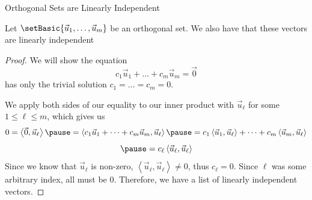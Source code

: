 \documentclass[xcoler=dvipsnames, aspectratio=169]{beamer}
\newcommand{\ip}[2]{\left\langle #1,#2\right\rangle}
\begin{document}
    \begin{frame}{Orthogonal Sets are Linearly Independent}
        \small
        \begin{theorem}
            Let $\setBasic{\vec{u}_1,\dots,\vec{u}_m}$ be an orthogonal set. We also have that
            these vectors are linearly independent
        \end{theorem}\pause
        \begin{proof}
            We will show the equation
            \[
                c_1\vec{u}_1 + \dots + c_m\vec{u}_m = \vec{0}
            \]
            has only the trivial solution $c_1=\dots=c_m=0$.

            We apply both sides of our equality to our inner product with $\vec{u}_\ell$ for some
            $1\leq\ell\leq m$, which gives us
            \[
                0 = \ip{\vec{0}}{\vec{u}_\ell}\pause =
                \ip{c_1\vec{u}_1 + \dots + c_m\vec{u}_m}{\vec{u}_\ell}
                \pause = c_1\ip{\vec{u}_1}{\vec{u}_\ell} + \dots + c_m\ip{\vec{u}_m}{\vec{u}_\ell}
            \]
            \vspace{-20pt}
            \[
                \pause = c_\ell\ip{\vec{u}_\ell}{\vec{u}_\ell}
            \]
            Since we know that $\vec{u}_\ell$ is non-zero, $\ip{\vec{u}_\ell}{\vec{u}_\ell}\neq 0$,
            thus $c_\ell=0$. Since $\ell$ was some arbitrary index, all must be $0$. Therefore,
            we have a list of linearly independent vectors.
        \end{proof}
    \end{frame}
\end{document}
